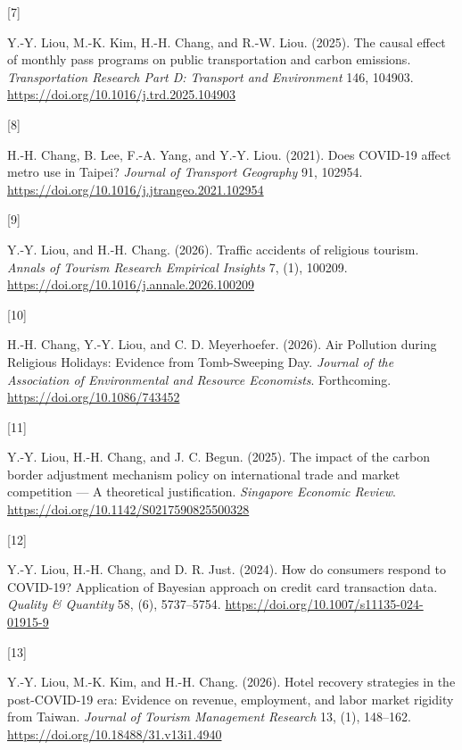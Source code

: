 \documentclass[
  11pt,
]{article}
\newlength{\cslhangindent}
\newlength{\csllabelwidth}
\newenvironment{CSLReferences}[2] %
 {\begin{list}{}{%
  \setlength{\itemindent}{0pt}
  \setlength{\leftmargin}{0pt}
  \setlength{\parsep}{0pt}
  \ifodd #1
   \setlength{\leftmargin}{\cslhangindent}
   \setlength{\itemindent}{-1\cslhangindent}
  \fi
  \setlength{\itemsep}{#2\baselineskip}}}
 {\end{list}}
\newcommand{\CSLLeftMargin}[1]{\parbox[t]{\csllabelwidth}{\strut#1\strut}}
\newcommand{\CSLRightInline}[1]{\parbox[t]{\linewidth - \csllabelwidth}{\strut#1\strut}}
\begin{document}
\begin{CSLReferences}{0}{0}
\CSLLeftMargin{{[}7{]} }%
\CSLRightInline{Y.-Y. Liou, M.-K. Kim, H.-H. Chang, and R.-W. Liou.
(2025). The causal effect of monthly pass programs on public
transportation and carbon emissions. \emph{Transportation Research Part
D: Transport and Environment} 146, 104903.
\url{https://doi.org/10.1016/j.trd.2025.104903}}

\CSLLeftMargin{{[}8{]} }%
\CSLRightInline{H.-H. Chang, B. Lee, F.-A. Yang, and Y.-Y. Liou. (2021).
Does COVID-19 affect metro use in {T}aipei? \emph{Journal of Transport
Geography} 91, 102954.
\url{https://doi.org/10.1016/j.jtrangeo.2021.102954}}

\CSLLeftMargin{{[}9{]} }%
\CSLRightInline{Y.-Y. Liou, and H.-H. Chang. (2026). Traffic accidents
of religious tourism. \emph{Annals of Tourism Research Empirical
Insights} 7, (1), 100209.
\url{https://doi.org/10.1016/j.annale.2026.100209}}

\CSLLeftMargin{{[}10{]} }%
\CSLRightInline{H.-H. Chang, Y.-Y. Liou, and C. D. Meyerhoefer. (2026).
{Air Pollution during Religious Holidays: Evidence from Tomb-Sweeping
Day}. \emph{Journal of the Association of Environmental and Resource
Economists}. Forthcoming. \url{https://doi.org/10.1086/743452}}

\CSLLeftMargin{{[}11{]} }%
\CSLRightInline{Y.-Y. Liou, H.-H. Chang, and J. C. Begun. (2025). The
impact of the carbon border adjustment mechanism policy on international
trade and market competition --- {A} theoretical justification.
\emph{Singapore Economic Review}.
\url{https://doi.org/10.1142/S0217590825500328}}

\CSLLeftMargin{{[}12{]} }%
\CSLRightInline{Y.-Y. Liou, H.-H. Chang, and D. R. Just. (2024). How do
consumers respond to COVID-19? Application of {B}ayesian approach on
credit card transaction data. \emph{Quality \& Quantity} 58, (6),
5737--5754. \url{https://doi.org/10.1007/s11135-024-01915-9}}

\CSLLeftMargin{{[}13{]} }%
\CSLRightInline{Y.-Y. Liou, M.-K. Kim, and H.-H. Chang. (2026). Hotel
recovery strategies in the post-COVID-19 era: Evidence on revenue,
employment, and labor market rigidity from {T}aiwan. \emph{Journal of
Tourism Management Research} 13, (1), 148--162.
\url{https://doi.org/10.18488/31.v13i1.4940}}

\end{CSLReferences}
\end{document}
